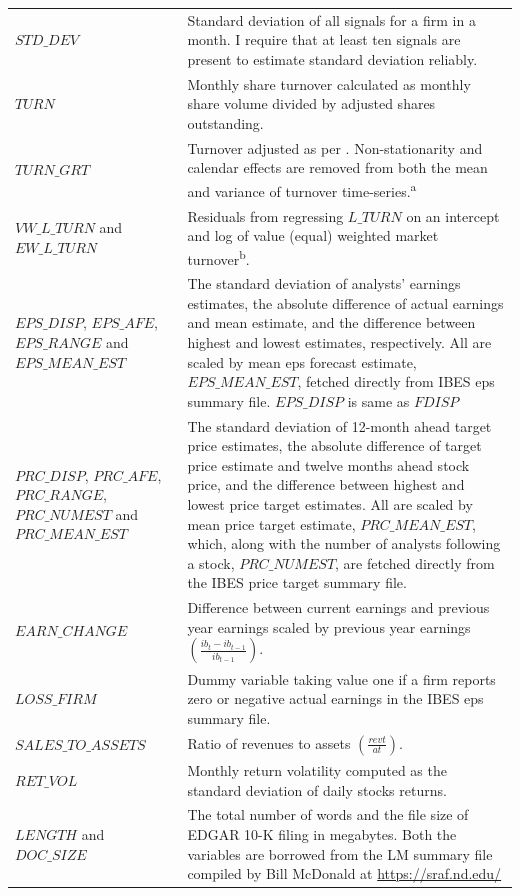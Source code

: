 \documentclass[
  12pt,
  a4paper,
  twoside,
  onecolumn]{article}
\begin{document}
\begin{landscape}
\begin{ThreePartTable}
\begin{spacing}{1.0}
\begin{longtable}[t]{>{\raggedright\arraybackslash}p{5.2cm}>{\raggedright\arraybackslash}p{15.6cm}}
\addlinespace
$STD\_DEV$ & Standard deviation of all signals for a firm in a month. I require that at least ten signals are present to estimate standard deviation reliably.\\
\addlinespace
$TURN$ & Monthly share turnover calculated as monthly share volume divided by adjusted shares outstanding.\\
\addlinespace
$TURN\_GRT$ & Turnover adjusted as per \cite{grt1992}. Non-stationarity and calendar effects are removed from both the mean and variance of turnover time-series.\textsuperscript{a}\\
\addlinespace
$VW\_L\_TURN$ and $EW\_L\_TURN$ & Residuals from regressing $L\_TURN$ on an intercept and log of value (equal) weighted market turnover\textsuperscript{b}.\\
\addlinespace
$EPS\_DISP$, $EPS\_AFE$, $EPS\_RANGE$ and $EPS\_MEAN\_EST$ & The standard deviation of analysts' earnings estimates, the absolute difference of actual earnings and mean estimate, and the difference between highest and lowest estimates, respectively. All are scaled by mean eps forecast estimate, $EPS\_MEAN\_EST$, fetched directly from IBES eps summary file. $EPS\_DISP$ is same as $FDISP$\\
\addlinespace
$PRC\_DISP$, $PRC\_AFE$, $PRC\_RANGE$, $PRC\_NUMEST$ and $PRC\_MEAN\_EST$ & The standard deviation of 12-month ahead target price estimates, the absolute difference of target price estimate and twelve months ahead stock price, and the difference between highest and lowest price target estimates. All are scaled by mean price target estimate, $PRC\_MEAN\_EST$, which, along with the number of analysts following a stock, $PRC\_NUMEST$, are fetched directly from the IBES price target summary file.\\
\addlinespace
$EARN\_CHANGE$ & Difference between current earnings and previous year earnings scaled by previous year earnings $\left( \frac{ib_t - ib_{t-1}}{ib_{t-1}} \right)$.\\
\addlinespace
$LOSS\_FIRM$ & Dummy variable taking value one if a firm reports zero or negative actual earnings in the IBES eps summary file.\\
\addlinespace
$SALES\_TO\_ASSETS$ & Ratio of revenues to assets $\left( \frac{revt}{at} \right)$.\\
\addlinespace
$RET\_VOL$ & Monthly return volatility computed as the standard deviation of daily stocks returns.\\
\addlinespace
$LENGTH$ and $DOC\_SIZE$ & The total number of words and the file size of EDGAR 10-K filing in megabytes. Both the variables are borrowed from the LM summary file compiled by Bill McDonald at \url{https://sraf.nd.edu/}\\

\end{longtable}
\end{spacing}
\end{ThreePartTable}
\end{landscape}
\end{document}
